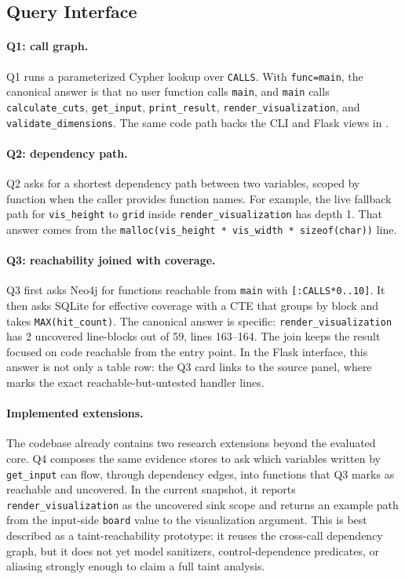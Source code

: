 \documentclass[11pt,twocolumn]{article}
\begin{document}
\subsection{Query Interface}

\paragraph{Q1: call graph.}
Q1 runs a parameterized Cypher lookup over \texttt{CALLS}. With
\texttt{func=main}, the canonical answer is that no user function calls
\texttt{main}, and \texttt{main} calls \texttt{calculate\_cuts},
\texttt{get\_input}, \texttt{print\_result}, \texttt{render\_visualization},
and \texttt{validate\_dimensions}. The same code path backs the CLI and Flask
views in .

\paragraph{Q2: dependency path.}
Q2 asks for a shortest dependency path between two variables, scoped by
function when the caller provides function names. For example, the live fallback
path for \texttt{vis\_height} to \texttt{grid} inside
\texttt{render\_visualization} has depth 1. That answer comes from the
\texttt{malloc(vis\_height * vis\_width * sizeof(char))} line.

\paragraph{Q3: reachability joined with coverage.}
Q3 first asks Neo4j for functions reachable from \texttt{main} with
\texttt{[:CALLS*0..10]}. It then asks SQLite for effective coverage with a CTE
that groups by block and takes \texttt{MAX(hit\_count)}. The canonical answer is
specific: \texttt{render\_visualization} has 2 uncovered line-blocks out of 59,
lines 163--164. The join keeps the result focused on code reachable from the
entry point. In the Flask interface, this answer is not only a table row: the
Q3 card links to the source panel, where
 marks the exact reachable-but-untested
handler lines.

\paragraph{Implemented extensions.}
The codebase already contains two research extensions beyond the evaluated core.
Q4 composes the same evidence stores to ask which variables written by
\texttt{get\_input} can flow, through dependency edges, into functions that Q3
marks as reachable and uncovered. In the current snapshot, it reports
\texttt{render\_visualization} as the uncovered sink scope and returns an
example path from the input-side \texttt{board} value to the visualization
argument. This is best described as a taint-reachability prototype: it reuses
the cross-call dependency graph, but it does not yet model sanitizers,
control-dependence predicates, or aliasing strongly enough to claim a full
taint analysis.
\end{document}
